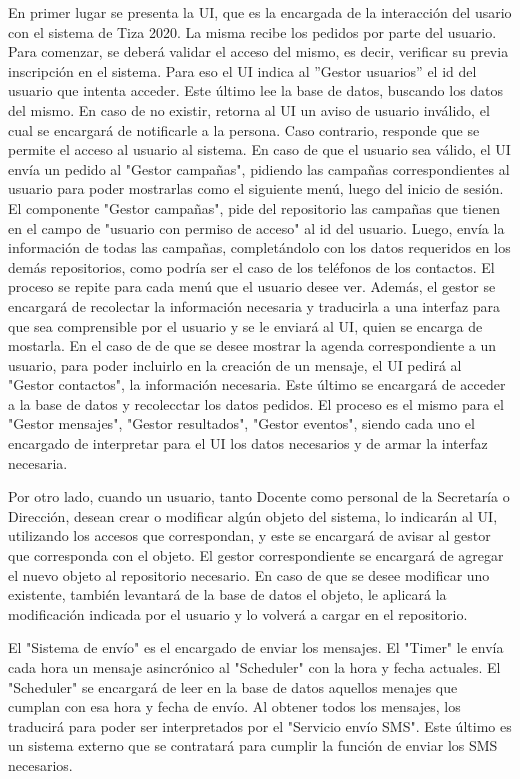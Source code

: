 \documentclass[a4paper, 11pt]{article}
\begin{document}
En primer lugar se presenta la UI, que es la encargada de la interacción del usario con el sistema de Tiza 2020. La misma recibe los pedidos por parte del usuario. Para comenzar, se deberá validar el acceso del mismo, es decir, verificar su previa inscripción en el sistema. Para eso el UI indica al ''Gestor usuarios'' el id del usuario que intenta acceder. Este último lee la base de datos, buscando los datos del mismo. En caso de no existir, retorna al UI un aviso de usuario inválido, el cual se encargará de notificarle a la persona. Caso contrario, responde que se permite el acceso al usuario al sistema. 
En caso de que el usuario sea válido, el UI envía un pedido al "Gestor campañas", pidiendo las campañas correspondientes al usuario para poder mostrarlas como el siguiente menú, luego del inicio de sesión. El componente "Gestor campañas", pide del repositorio las campañas que tienen en el campo de "usuario con permiso de acceso" al id del usuario. Luego, envía la información de todas las campañas, completándolo con los datos requeridos en los demás repositorios, como podría ser el caso de los teléfonos de los contactos. 
El proceso se repite para cada menú que el usuario desee ver. Además, el gestor se encargará de recolectar la información necesaria y traducirla a una interfaz para que sea comprensible por el usuario y se le enviará al UI, quien se encarga de mostarla. En el caso de de que se desee mostrar la agenda correspondiente a un usuario, para poder incluirlo en la creación de un mensaje, el UI pedirá al "Gestor contactos", la información necesaria. Este último se encargará de acceder a la base de datos y recolecctar los datos pedidos. El proceso es el mismo para el "Gestor mensajes", "Gestor resultados", "Gestor eventos", siendo cada uno el encargado de interpretar para el UI los datos necesarios y de armar la interfaz necesaria. 

Por otro lado, cuando un usuario, tanto Docente como personal de la Secretaría o Dirección, desean crear o modificar algún objeto del sistema, lo indicarán al UI, utilizando los accesos que correspondan, y este se encargará de avisar al gestor que corresponda con el objeto. El gestor correspondiente se encargará de agregar el nuevo objeto al repositorio necesario.  En caso de que se desee modificar uno existente, también levantará de la base de datos el objeto, le aplicará la modificación indicada por el usuario y lo volverá a cargar en el repositorio. 

El "Sistema de envío" es el encargado de enviar los mensajes. El "Timer" le envía cada hora un mensaje asincrónico al "Scheduler" con la hora y fecha actuales. El "Scheduler" se encargará de leer en la base de datos aquellos menajes que cumplan con esa hora y fecha de envío. Al obtener todos los mensajes, los traducirá para poder ser interpretados por el "Servicio envío SMS". Este último es un sistema externo que se contratará para cumplir la función de enviar los SMS necesarios. 
\end{document}
